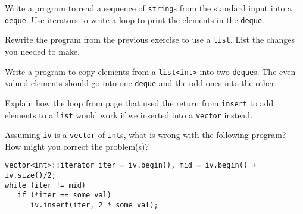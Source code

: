 %
%
\begin{question}
Write a program to read a sequence of \verb|string|s from the
standard input into a \verb|deque|. Use iterators to write a loop to print the
elements in the \verb|deque|.
\end{question}

\begin{question}
Rewrite the program from the previous exercise to use a
\verb|list|. List the changes you needed to make.
\end{question}

\begin{question}
Write a program to copy elements from a \verb|list<int>| into
two \verb|deque|s. The even-valued elements should go into one \verb|deque| and the
odd ones into the other.
\end{question}

\begin{question}
Explain how the loop from page \pageref{par:using the return from insert} that used the return
from \verb|insert| to add elements to a \verb|list| would work if we inserted into a
\verb|vector| instead.
\end{question}

\begin{question}
Assuming \verb|iv| is a \verb|vector| of \verb|int|s, what is wrong with the
following program? How might you correct the problem(s)?
\begin{lstlisting}
vector<int>::iterator iter = iv.begin(), mid = iv.begin() + iv.size()/2;
while (iter != mid)
   if (*iter == some_val)
      iv.insert(iter, 2 * some_val);
\end{lstlisting}
\end{question}
